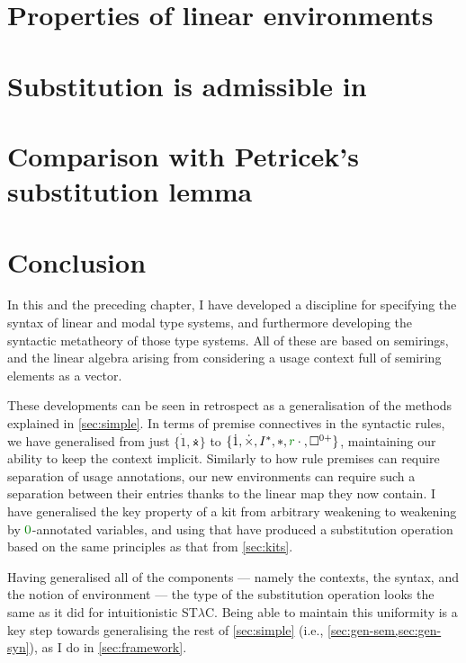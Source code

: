 \section{Properties of linear environments}\label{sec:lenv}

\section{Substitution is admissible in \name{}}\label{sec:lrsub}

\section{Comparison with Petricek's substitution lemma}\label{sec:petricek}


\section{Conclusion}\label{sec:ren-sub-lr-conc}

In this and the preceding chapter, I have developed a discipline for specifying
the syntax of linear and modal type systems, and furthermore developing the
syntactic metatheory of those type systems.
All of these are based on semirings, and the linear algebra arising from
considering a usage context full of semiring elements as a vector.

These developments can be seen in retrospect as a generalisation of the methods
explained in \cref{sec:simple}.
In terms of premise connectives in the syntactic rules, we have generalised from
just $\{\dot1, \dottimes\}$ to
$\{\dot1, \dottimes, I^*, \sep, \gr r\cdot{}, \Box^{0{+}}\}$, maintaining our
ability to keep the context implicit.
Similarly to how rule premises can require separation of usage annotations, our
new environments can require such a separation between their entries thanks to
the linear map they now contain.
I have generalised the key property of a kit from arbitrary weakening to
weakening by $\gr0$-annotated variables, and using that have produced a
substitution operation based on the same principles as that from
\cref{sec:kits}.

Having generalised all of the components --- namely the contexts, the syntax,
and the notion of environment --- the type of the substitution operation looks
the same as it did for intuitionistic ST$\lambda$C\@.
Being able to maintain this uniformity is a key step towards generalising the
rest of \cref{sec:simple} (i.e., \cref{sec:gen-sem,sec:gen-syn}), as I do in
\cref{sec:framework}.

